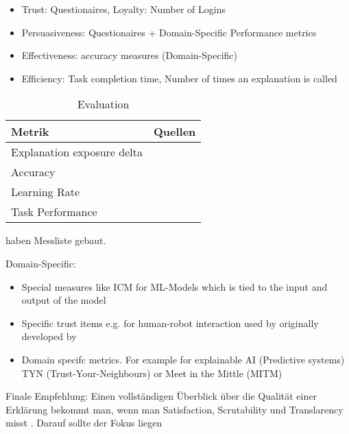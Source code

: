 \begin{itemize}
    \item Trust: Questionaires, Loyalty: Number of Logins
    \item Persuasiveness: Questionaires + Domain-Specific Performance metrics
    \item  Effectiveness: accuracy measures (Domain-Specific) 
    \item Efficiency: Task completion time, Number of times an explanation is called
\end{itemize}

\begin{table}[htb!]
    \begin{center}
        \begin{tabular}{|p{}|p{}|}
            \hline
            \textbf{Metrik} & \textbf{Quellen} \\ \hline
            Explanation exposure delta & \\
            Accuracy                          & \cite{tintarev_designing_nodate}
                                                            \cite{waa_evaluating_2021} \cite{mucha_interfaces_2021}
                                                            \cite{kunkel_let_2019} \cite{zolotas_towards_2019} \\
            Learning Rate                     & \cite{tintarev_designing_nodate} \cite{gunning2019darpa} \\
            Task Performance                  & \cite{waa_evaluating_2021}  \cite{mucha_interfaces_2021}  
                                                            \cite{abdulrahman_belief-based_2019} 
                                                            \cite{zolotas_towards_2019} \cite{martin_developing_2019} 
                                                            \cite{martin_evaluating_2021} \cite{gunning2019darpa} \\
            \hline
        \end{tabular}
    \end{center}
    \caption{Evaluation}
    \label{tab:evaluation_of_explanations}
\end{table}

\cite{tintarev_designing_nodate} haben Messliste gebaut.

Domain-Specific:

\begin{itemize}
    \item Special measures like ICM for ML-Models which is tied to the input and output of the model \cite{waa_evaluating_2021, neerincx_using_2018}
    \item Specific trust items e.g. for human-robot interaction used by \cite{zhu_effects_2020} originally developed by \cite{schaefer2013perception}
    \item 
    Domain specifc metrics. For example for explainable AI (Predictive systems) TYN (Trust-Your-Neighbours) or Meet in the Mittle (MITM) \cite{martin_evaluating_2021}
\end{itemize}


Finale Empfehlung: Einen vollständigen Überblick über die Qualität einer Erklärung bekommt man, wenn man Satisfaction, Scrutability und Translarency misst \cite{balog_measuring_2020}. Darauf sollte der Fokus liegen